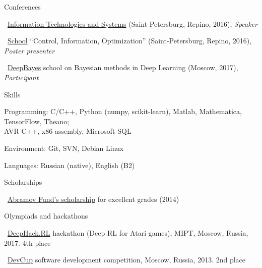 \documentclass{resume} %
\begin{document}
\begin{rSection}{Conferences}
\item \faExternalLink~\href{http://iitp.ru/en/conferences/itas}{Information Technologies and Systems} (Saint-Petersburg, Repino, 2016){, \em Speaker}
\item \faExternalLink~\href{https://sites.google.com/site/traditionalschool/about}{School} ``Control, Information, Optimization'' (Saint-Petersburg, Repino, 2016){, \em Poster presenter}
\item \faExternalLink~\href{http://deepbayes.ru}{DeepBayes} school on Bayesian methods in Deep Learning (Moscow, 2017){, \em Participant}
\end{rSection}

\newpage

\begin{rSection}{Skills}
	\item Programming: C/C++, Python (numpy, scikit-learn), Matlab, Mathematica, TensorFlow, Theano; \\AVR C++, x86 assembly, Microsoft SQL
	\item Environment: Git, SVN, Debian Linux
	\item Languages: Russian (native), English (B2)
\end{rSection}

\begin{rSection}{Scholarships}
\item \faExternalLink~\href{http://phystech-foundation.org/}{Abramov Fund's scholarship} for excellent grades (2014)
\end{rSection}


\begin{rSection}{Olympiads and hackathons}
\item \faExternalLink~\href{http://rl.deephack.me/}{DeepHack.RL} hackathon (Deep RL for Atari games), MIPT, Moscow, Russia, 2017. 4th place
\item \faExternalLink~\href{https://vk.com/devcup}{DevCup} software development competition, Moscow, Russia, 2013. 2nd place
\end{rSection}
\end{document}
